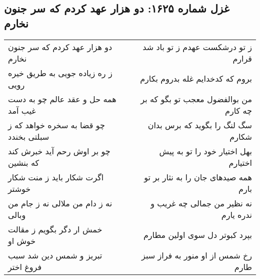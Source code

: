 \begin{center}
\section*{غزل شماره ۱۶۲۵: دو هزار عهد کردم که سر جنون نخارم}
\label{sec:1625}
\begin{longtable}{l p{0.5cm} r}
دو هزار عهد کردم که سر جنون نخارم
&&
ز تو درشکست عهدم ز تو باد شد قرارم
\\
ز ره زیاده جویی به طریق خیره رویی
&&
بروم که کدخدایم غله بدروم بکارم
\\
همه حل و عقد عالم چو به دست غیب آمد
&&
من بوالفضول معجب تو بگو که بر چه کارم
\\
چو قضا به سخره خواهد که ز سبلتی بخندد
&&
سگ لنگ را بگوید که برس بدان شکارم
\\
چو بر اوش رحم آید خبرش کند که بنشین
&&
بهل اختیار خود را تو به پیش اختیارم
\\
اگرت شکار باید ز منت شکار خوشتر
&&
همه صیدهای جان را به نثار بر تو بارم
\\
نه ز دام من ملالی نه ز جام من وبالی
&&
نه نظیر من جمالی چه غریب و ندره یارم
\\
خمش ار دگر بگویم ز مقالت خوش او
&&
بپرد کبوتر دل سوی اولین مطارم
\\
تبریز و شمس دین شد سبب فروغ اختر
&&
رخ شمس از او منور به فراز سبز طارم
\\
\end{longtable}
\end{center}
